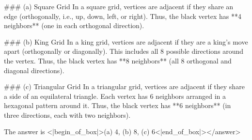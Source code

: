 ### (a) Square Grid  
In a square grid, vertices are adjacent if they share an edge (orthogonally, i.e., up, down, left, or right). Thus, the black vertex has **4 neighbors** (one in each orthogonal direction).  

### (b) King Grid  
In a king grid, vertices are adjacent if they are a king’s move apart (orthogonally or diagonally). This includes all 8 possible directions around the vertex. Thus, the black vertex has **8 neighbors** (all 8 orthogonal and diagonal directions).  

### (c) Triangular Grid  
In a triangular grid, vertices are adjacent if they share a side of an equilateral triangle. Each vertex has 6 neighbors arranged in a hexagonal pattern around it. Thus, the black vertex has **6 neighbors** (in three directions, each with two neighbors).  

The answer is  
<|begin_of_box|>(a) 4, (b) 8, (c) 6<|end_of_box|></answer>